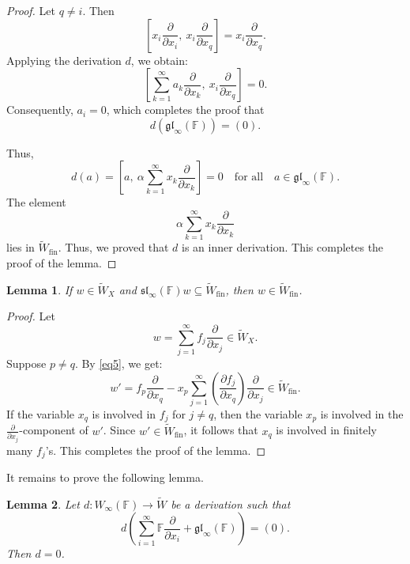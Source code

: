 \documentclass[12pt,a4paper]{amsart}
\theoremstyle{plain}
\newtheorem{Lemma}{Lemma}
\begin{document}
\begin{proof}
		Let \( q \ne i \). Then
		\[
		\left[ x_i \frac{\partial}{\partial x_i}, \ x_i \frac{\partial}{\partial x_q} \right] = x_i \frac{\partial}{\partial x_q}.
		\] Applying the derivation \( d \), we obtain:
		\[
		\left[ \sum_{k=1}^\infty a_k \frac{\partial}{\partial x_k}, \ x_i \frac{\partial}{\partial x_q} \right] = 0.
		\] Consequently, \( a_i = 0 \), which completes the proof that
		\[
		d(\mathfrak{gl}_\infty(\mathbb{F})) = (0).
		\]
		
		Thus, \[
		d(a) = \left[a, \ \alpha  \sum_{k=1}^\infty  x_k  \frac{\partial}{\partial x_k}\right] = 0 \quad \text{for all} \quad a \in \mathfrak{gl}_\infty(\mathbb{F}).
		\] The element $$\alpha  \sum_{k=1}^\infty x_k  \frac{\partial}{\partial x_k}$$ lies in $\widetilde{W}_{\text{fin}}.$ Thus, we proved that $d$ is an inner derivation. This completes the proof of the lemma. 
	\end{proof}
	
	
	\begin{Lemma}\label{Lemma9} If $w \in \widetilde{W}_X$ and $\mathfrak{sl}_\infty(\mathbb{F}) w \subseteq \widetilde{W}_{\text{fin}}$, then $w \in \widetilde{W}_{\text{fin}}$. \end{Lemma} 
	
	\begin{proof} Let $$w = \sum_{j=1}^{\infty} f_j \frac{\partial}{\partial x_j}\in \widetilde{W}_X.$$ Suppose $p \neq q$. By \eqref{eq5}, we get:
		\[
		w' = f_p \frac{\partial}{\partial x_q}- x_p \sum_{j=1}^{\infty} \left( \frac{\partial f_j}{\partial x_q}\right) \frac{\partial}{\partial x_j} \in \widetilde{W}_{\text{fin}}.
		\] If the variable $x_q$ is involved in $f_j$ for $j \neq q$, then the variable $x_p$ is involved in the $\frac{\partial}{\partial x_j}$-component of $w'$. Since $w' \in \widetilde{W}_{\text{fin}}$, it follows that $x_q$ is involved in finitely many $f_j$'s. This completes the proof of the lemma. \end{proof}
	
	It remains to prove the following lemma.
	\begin{Lemma}\label{Lemma10}  Let $d : W_\infty(\mathbb{F}) \to \widetilde{W}$ be a derivation such that
		\[
		d\left( \sum_{i=1}^{\infty} \mathbb{F}  \frac{\partial}{\partial x_i} + \mathfrak{gl}_\infty(\mathbb{F}) \right) = (0).
		\]
		Then \( d = 0 \). \end{Lemma}
	
\end{document}
